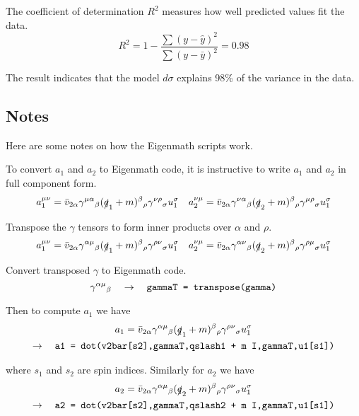 \documentclass[12pt]{article}
\begin{document}
The coefficient of determination $R^2$ measures how well predicted values fit the data.
\begin{equation*}
R^2=1-\frac{\sum(y-\hat{y})^2}{\sum(y-\bar{y})^2}=0.98
\end{equation*}

The result indicates that the model $d\sigma$ explains 98\% of the variance in the data.

\subsection*{Notes}
Here are some notes on how the Eigenmath scripts work.

\bigskip
To convert $a_1$ and $a_2$ to Eigenmath code,
it is instructive to write $a_1$ and $a_2$ in full component form.
\begin{equation*}
a_1^{\mu\nu}
=\bar{v}_{2\alpha}\gamma^{\mu\alpha}{}_\beta(\slashed{q}_1+m)^\beta{}_\rho\gamma^{\nu\rho}{}_\sigma u_1^\sigma
\quad
a_2^{\nu\mu}
=\bar{v}_{2\alpha}\gamma^{\nu\alpha}{}_\beta(\slashed{q}_2+m)^\beta{}_\rho\gamma^{\mu\rho}{}_\sigma u_1^\sigma
\end{equation*}

Transpose the $\gamma$ tensors to form inner products over $\alpha$ and $\rho$.
\begin{equation*}
a_1^{\mu\nu}
=\bar{v}_{2\alpha}\gamma^{\alpha\mu}{}_\beta(\slashed{q}_1+m)^\beta{}_\rho\gamma^{\rho\nu}{}_\sigma u_1^\sigma
\quad
a_2^{\nu\mu}
=\bar{v}_{2\alpha}\gamma^{\alpha\nu}{}_\beta(\slashed{q}_2+m)^\beta{}_\rho\gamma^{\rho\mu}{}_\sigma u_1^\sigma
\end{equation*}

Convert transposed $\gamma$ to Eigenmath code.
\begin{equation*}
\gamma^{\alpha\mu}{}_\beta
\quad\rightarrow\quad
\text{\tt gammaT = transpose(gamma)}
\end{equation*}

Then to compute $a_1$ we have
\begin{multline*}
a_1=\bar{v}_{2\alpha}\gamma^{\alpha\mu}{}_\beta(\slashed{q}_1+m)^\beta{}_\rho\gamma^{\rho\nu}{}_\sigma u_1^\sigma
\\
\rightarrow\quad
\text{\tt a1 = dot(v2bar[s2],gammaT,qslash1 + m I,gammaT,u1[s1])}
\end{multline*}

where $s_1$ and $s_2$ are spin indices.
Similarly for $a_2$ we have
\begin{multline*}
a_2=\bar{v}_{2\alpha}\gamma^{\alpha\mu}{}_\beta(\slashed{q}_2+m)^\beta{}_\rho\gamma^{\rho\nu}{}_\sigma u_1^\sigma
\\
\rightarrow\quad
\text{\tt a2 = dot(v2bar[s2],gammaT,qslash2 + m I,gammaT,u1[s1])}
\end{multline*}
\end{document}

